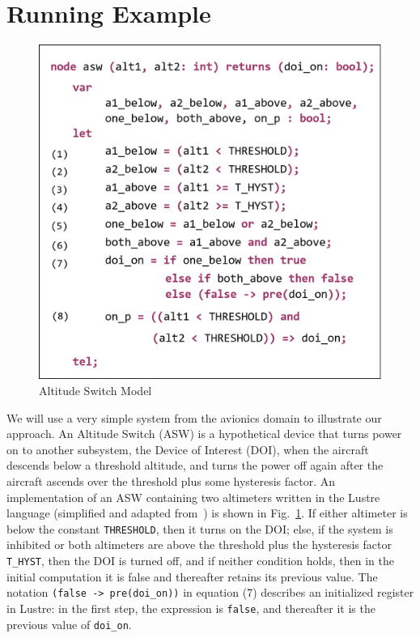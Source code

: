 \section{Running Example}
\label{sec:example}


\begin{figure}
\centering
\includegraphics[width=0.9\columnwidth]{figs/aswcode.png}
\vspace{-0.1in}
\caption{Altitude Switch Model }
\label{fig:asw}
\end{figure}

We will use a very simple system from the avionics domain to illustrate our approach. An Altitude Switch (ASW) is a hypothetical device that turns power on to another subsystem, the Device of Interest (DOI), when the aircraft descends below a threshold altitude, and turns the power off again after the aircraft ascends over the threshold plus some hysteresis factor.  An implementation of an ASW containing two altimeters written in the Lustre language (simplified and adapted from~\cite{HCW02:ase-deviation}) is shown in Fig.~\ref{fig:asw}.  If either altimeter is below the constant {\small \texttt{THRESHOLD}}, then it turns on the DOI; else, if the system is inhibited or both altimeters are above the threshold plus the hysteresis factor {\small \texttt{T\_HYST}}, then the DOI is turned off, and if neither condition holds, then in the initial computation it is false and thereafter retains its previous value.  The notation {\small \texttt{(false -> pre(doi\_on))}} in equation (7) describes an initialized register in Lustre: in the first step, the expression is {\small \texttt{false}}, and thereafter it is the previous value of {\small \texttt{doi\_on}}.

